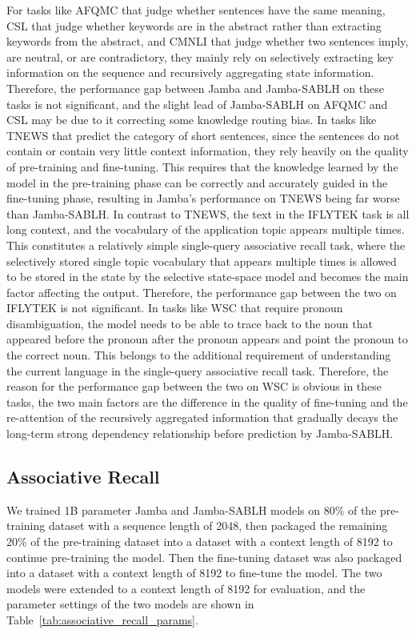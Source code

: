 \documentclass{article}
\theoremstyle{plain}
\theoremstyle{definition}
\theoremstyle{remark}
\begin{document}
For tasks like AFQMC that judge whether sentences have the same meaning, CSL that judge whether keywords are in the abstract rather than extracting keywords from the abstract, and CMNLI that judge whether two sentences imply, are neutral, or are contradictory, they mainly rely on selectively extracting key information on the sequence and recursively aggregating state information. Therefore, the performance gap between Jamba and Jamba-SABLH on these tasks is not significant, and the slight lead of Jamba-SABLH on AFQMC and CSL may be due to it correcting some knowledge routing bias. In tasks like TNEWS that predict the category of short sentences, since the sentences do not contain or contain very little context information, they rely heavily on the quality of pre-training and fine-tuning. This requires that the knowledge learned by the model in the pre-training phase can be correctly and accurately guided in the fine-tuning phase, resulting in Jamba's performance on TNEWS being far worse than Jamba-SABLH. In contrast to TNEWS, the text in the IFLYTEK task is all long context, and the vocabulary of the application topic appears multiple times. This constitutes a relatively simple single-query associative recall task, where the selectively stored single topic vocabulary that appears multiple times is allowed to be stored in the state by the selective state-space model and becomes the main factor affecting the output. Therefore, the performance gap between the two on IFLYTEK is not significant. In tasks like WSC that require pronoun disambiguation, the model needs to be able to trace back to the noun that appeared before the pronoun after the pronoun appears and point the pronoun to the correct noun. This belongs to the additional requirement of understanding the current language in the single-query associative recall task. Therefore, the reason for the performance gap between the two on WSC is obvious in these tasks, the two main factors are the difference in the quality of fine-tuning and the re-attention of the recursively aggregated information that gradually decays the long-term strong dependency relationship before prediction by Jamba-SABLH.


\subsection{Associative Recall}
\label{sec:Associative_Recall}
We trained 1B parameter Jamba and Jamba-SABLH models on 80\% of the pre-training dataset with a sequence length of 2048, then packaged the remaining 20\% of the pre-training dataset into a dataset with a context length of 8192 to continue pre-training the model. Then the fine-tuning dataset was also packaged into a dataset with a context length of 8192 to fine-tune the model. The two models were extended to a context length of 8192 for evaluation, and the parameter settings of the two models are shown in Table~\ref{tab:associative_recall_params}.
\end{document}
